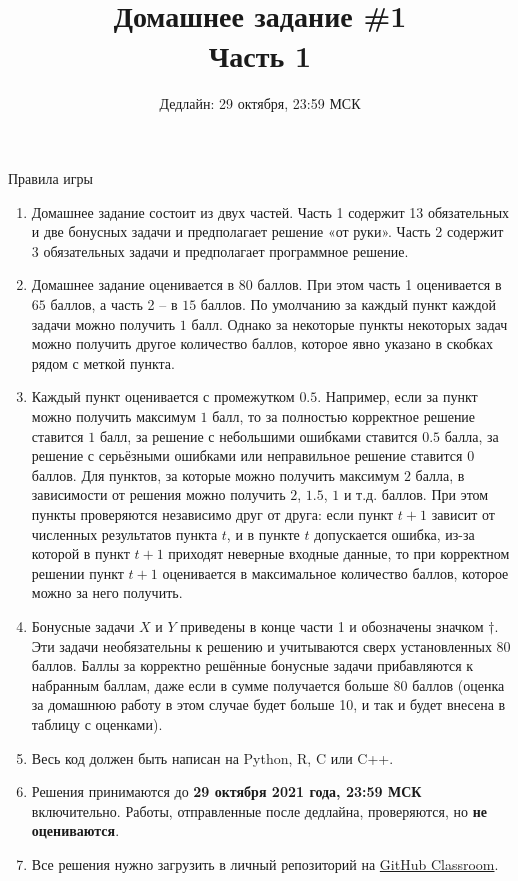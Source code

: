 \documentclass[10pt, a4paper]{extarticle}
\title{\vspace{-2em}{\normalsize Прикладная статистика в машинном обучении} \\\vspace{0.5em} Домашнее задание \#1 \vspace{0.2em}\\ \Large Часть 1}
\author{Дедлайн: 29 октября, 23:59 МСК}
\date{\rule{15cm}{0.4pt}}
\begin{document}
	
	\maketitle
	
	\vspace{-2em}
	\begin{rulesbox}{Правила игры}
		\begin{enumerate}
			\item Домашнее задание состоит из двух частей. Часть 1 содержит 13 обязательных и две бонусных задачи и предполагает решение «от руки». Часть 2 содержит 3 обязательных задачи и предполагает программное решение.
			\item Домашнее задание оценивается в $80$ баллов. При этом часть 1 оценивается в $65$ баллов, а часть 2 – в $15$ баллов. По умолчанию за каждый пункт каждой задачи можно получить $1$ балл. Однако за некоторые пункты некоторых задач можно получить другое количество баллов, которое явно указано в скобках рядом с меткой пункта.
			\item Каждый пункт оценивается с промежутком $0.5$. Например, если за пункт можно получить максимум $1$ балл, то за полностью корректное решение ставится $1$ балл, за решение с небольшими ошибками ставится $0.5$ балла, за решение с серьёзными ошибками или неправильное решение ставится $0$ баллов. Для пунктов, за которые можно получить максимум $2$ балла, в зависимости от решения можно получить $2$, $1.5$, $1$ и т.д. баллов. При этом пункты проверяются независимо друг от друга: если пункт $t+1$ зависит от численных результатов пункта $t$, и в пункте $t$ допускается ошибка, из-за которой в пункт $t+1$ приходят неверные входные данные, то при корректном решении пункт $t+1$ оценивается в максимальное количество баллов, которое можно за него получить.
			\item Бонусные задачи $X$ и $Y$ приведены в конце части 1 и обозначены значком $\dagger$. Эти задачи необязательны к решению и учитываются сверх установленных $80$ баллов. Баллы за корректно решённые бонусные задачи прибавляются к набранным баллам, даже если в сумме получается больше $80$ баллов (оценка за домашнюю работу в этом случае будет больше 10, и так и будет внесена в таблицу с оценками).
			\item Весь код должен быть написан на Python, R, C или C++.
			\item Решения принимаются до \textbf{29 октября 2021 года, 23:59 МСК} включительно.
			Работы, отправленные после дедлайна, проверяются, но \textbf{не оцениваются}.
			\item Все решения нужно загрузить в личный репозиторий на \href{https://classroom.github.com/a/KZaAKjaA}{GitHub Classroom}.

\end{enumerate}
\end{rulesbox}
\end{document}
